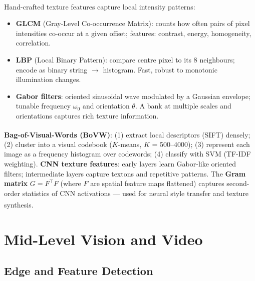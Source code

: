 \begin{tcbitemize}[ skin=sectionraster ]
    \tcbitem[title={Classical Texture Descriptors}, raster multicolumn=3]
    Hand-crafted texture features capture local intensity patterns\textsuperscript{\cite[][pp.~645--662]{szeliski2022}}:
    \begin{itemize}
        \item \textbf{GLCM} (Gray-Level Co-occurrence Matrix): counts how often pairs of pixel intensities co-occur at a given offset; features: contrast, energy, homogeneity, correlation.
        \item \textbf{LBP} (Local Binary Pattern): compare centre pixel to its 8 neighbours; encode as binary string $\to$ histogram. Fast, robust to monotonic illumination changes.
        \item \textbf{Gabor filters}: oriented sinusoidal wave modulated by a Gaussian envelope; tunable frequency $\omega_0$ and orientation $\theta$. A bank at multiple scales and orientations captures rich texture information.
    \end{itemize}

    \tcbitem[title={Bag-of-Visual-Words and CNN Texture}, raster multicolumn=3]
    \textbf{Bag-of-Visual-Words (BoVW)}\textsuperscript{\cite[][pp.~682--686]{szeliski2022}}: (1) extract local descriptors (SIFT) densely; (2) cluster into a visual codebook ($K$-means, $K$ = 500–4000); (3) represent each image as a frequency histogram over codewords; (4) classify with SVM (TF-IDF weighting).
    \tcblower
    \textbf{CNN texture features}: early layers learn Gabor-like oriented filters; intermediate layers capture textons and repetitive patterns.
    The \textbf{Gram matrix} $G = F^\top F$ (where $F$ are spatial feature maps flattened) captures second-order statistics of CNN activations --- used for neural style transfer and texture synthesis\textsuperscript{\cite[][p.~119]{fleuretLittleBookDeep}}.
\end{tcbitemize}


\section{Mid-Level Vision and Video}

\subsection{Edge and Feature Detection}

